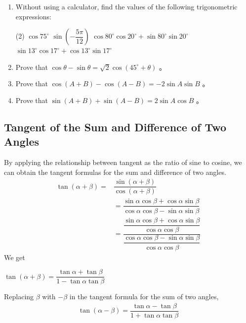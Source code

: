 \documentclass{report}
\begin{document}
\newpage
{}
\begin{enumerate}
	\item Without using a calculator, find the values of the following trigonometric expressions:
	      \begin{tasks}[label=(\alph*)](2)
	      	\task $\cos 75^{\circ}$
	      	\task $\sin \left(-\dfrac{5 \pi}{12}\right)$
	      	\task $\cos 80^{\circ} \cos 20^{\circ}+\sin 80^{\circ} \sin 20^{\circ}$
	      	\task $\sin 13^{\circ} \cos 17^{\circ}+\cos 13^{\circ} \sin 17^{\circ}$
	      \end{tasks}
	\item Prove that $\cos \theta-\sin \theta=\sqrt{2} \cos \left(45^{\circ}+\theta\right)$ 。
	\item Prove that $\cos (A+B)-\cos (A-B)=-2 \sin A \sin B$ 。
	\item Prove that $\sin (A+B)+\sin (A-B)=2 \sin A \cos B$ 。
\end{enumerate}

\subsection*{Tangent of the Sum and Difference of Two Angles}

By applying the relationship between tangent as the ratio of sine to cosine, we can obtain the tangent formulas for the sum and difference of two angles.
\begin{align*}
	\tan (\alpha+\beta)= & \dfrac{\sin (\alpha+\beta)}{\cos (\alpha+\beta)} \\ & =\dfrac{\sin \alpha \cos \beta+\cos \alpha \sin \beta}{\cos \alpha \cos \beta-\sin \alpha \sin \beta} \\ & =\dfrac{\dfrac{\sin \alpha \cos \beta+\cos \alpha \sin \beta}{\cos \alpha \cos \beta}}{\dfrac{\cos \alpha \cos \beta-\sin \alpha \sin \beta}{\cos \alpha \cos \beta}}
\end{align*}
We get
\begin{info}
	
	$\tan (\alpha+\beta)=\dfrac{\tan \alpha+\tan \beta}{1-\tan \alpha \tan \beta}$
\end{info}

Replacing \( \beta \) with \( -\beta \) in the tangent formula for the sum of two angles,
\begin{align*}
	\tan (\alpha-\beta)=\dfrac{\tan \alpha-\tan \beta}{1+\tan \alpha \tan \beta} 
\end{align*}
\end{document}
